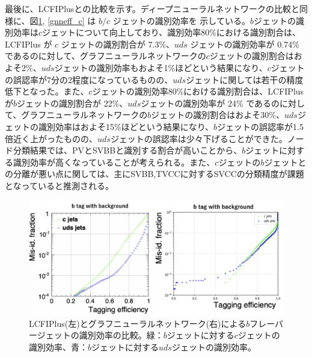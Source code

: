 最後に、LCFIPlusとの比較を示す。ディープニューラルネットワークの比較と同様に、図\ref{gnneff_b}, \ref{gnneff_c} は $b/c$ ジェットの識別効率を
示している。$b$ジェットの識別効率は$c$ジェットについて向上しており、識別効率80\%における識別割合は、LCFIPlus が $c$ ジェットの識別割合が 7.3\%、$uds$ ジェットの識別効率が 0.74\% であるのに対して、グラフニューラルネットワークの$c$ジェットの識別割合はおよそ2\%、$uds$ジェットの識別効率もおよそ1\%ほどという結果になり、$c$ジェットの誤認率が7分の2程度になっているものの、$uds$ジェットに関しては若干の精度低下となった。また、$c$ジェットの識別効率80\%における識別割合は、LCFIPlus が$b$ジェットの識別割合が 22\%、$uds$ジェットの識別効率が 24\% であるのに対して、グラフニューラルネットワークの$b$ジェットの識別割合はおよそ30\%、$uds$ジェットの識別効率はおよそ15\%ほどという結果になり、$b$ジェットの誤認率が1.5倍近く上がったものの、$uds$ジェットの誤認率は少々下げることができた。ノード分類結果では、PVとSVBBと識別する割合が高いことから、$b$ジェットに対する識別効率が高くなっていることが考えられる。また、$c$ジェットの$b$ジェットとの分離が悪い点に関しては、主にSVBB,TVCCに対するSVCCの分類精度が課題となっていると推測される。\\
\begin{figure}[H]
	\begin{center}
 \includegraphics[keepaspectratio, scale=0.33]
 	{Figure/Flavortagging/gnneff_b.png}
 		\caption{LCFIPlus(左)とグラフニューラルネットワーク(右)による$b$フレーバージェットの識別効率の比較。緑：$b$ジェットに対する$c$ジェットの識別効率、青：$b$ジェットに対する$uds$ジェットの識別効率。}
 		\label{gnneff_b}
	\end{center}
\end{figure}

